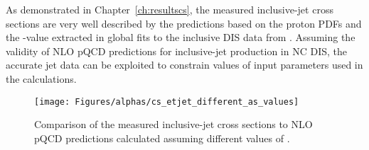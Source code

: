 As demonstrated in Chapter~\ref{ch:resultscs}, the measured inclusive-jet cross sections are very well described by the predictions based on the proton PDFs and the \asz-value extracted in global fits to the inclusive DIS data from \hera. Assuming the validity of NLO pQCD predictions for inclusive-jet production in NC DIS, the accurate jet data can be exploited to constrain values of input parameters used in the calculations.
\begin{figure}[p]
 \centering
 \texttt{[image: Figures/alphas/cs\_etjet\_different\_as\_values]}
 \caption{Comparison of the measured inclusive-jet cross sections to NLO pQCD predictions calculated assuming different values of \asz.}
 \label{fig:etjetdifferentas}
\end{figure}

